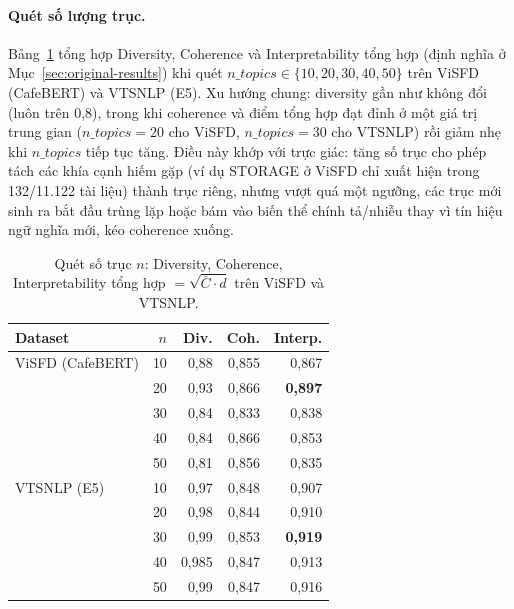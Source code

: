 \documentclass[11pt]{article}
\begin{document}
\paragraph{Quét số lượng trục.} Bảng~\ref{tab:ntopics-sweep} tổng hợp
Diversity, Coherence và Interpretability tổng hợp (định nghĩa ở
Mục~\ref{sec:original-results}) khi quét $n\_topics \in \{10,20,30,40,50\}$
trên ViSFD (CafeBERT) và VTSNLP (E5). Xu hướng chung: diversity gần như
không đổi (luôn trên 0,8), trong khi coherence và điểm tổng hợp đạt đỉnh ở
một giá trị trung gian ($n\_topics=20$ cho ViSFD, $n\_topics=30$ cho
VTSNLP) rồi giảm nhẹ khi $n\_topics$ tiếp tục tăng. Điều này khớp với trực
giác: tăng số trục cho phép tách các khía cạnh hiếm gặp (ví dụ STORAGE ở
ViSFD chỉ xuất hiện trong 132/11.122 tài liệu) thành trục riêng, nhưng vượt
quá một ngưỡng, các trục mới sinh ra bắt đầu trùng lặp hoặc bám vào biến
thể chính tả/nhiễu thay vì tín hiệu ngữ nghĩa mới, kéo coherence xuống.

\begin{table}[t]
    \centering
    \small
    \begin{tabular}{@{}l r r r r@{}}
        \toprule
        \textbf{Dataset} & \textbf{$n$} & \textbf{Div.} & \textbf{Coh.} & \textbf{Interp.} \\
        \midrule
        ViSFD (CafeBERT) & 10 & 0,88 & 0,855 & 0,867 \\
                          & 20 & 0,93 & 0,866 & \textbf{0,897} \\
                          & 30 & 0,84 & 0,833 & 0,838 \\
                          & 40 & 0,84 & 0,866 & 0,853 \\
                          & 50 & 0,81 & 0,856 & 0,835 \\
        \midrule
        VTSNLP (E5) & 10 & 0,97 & 0,848 & 0,907 \\
                     & 20 & 0,98 & 0,844 & 0,910 \\
                     & 30 & 0,99 & 0,853 & \textbf{0,919} \\
                     & 40 & 0,985 & 0,847 & 0,913 \\
                     & 50 & 0,99 & 0,847 & 0,916 \\
        \bottomrule
    \end{tabular}
    \caption{Quét số trục $n$: Diversity, Coherence, Interpretability tổng
    hợp $=\sqrt{\bar{C}\cdot d}$ trên ViSFD và VTSNLP.}
    \label{tab:ntopics-sweep}
\end{table}
\end{document}
